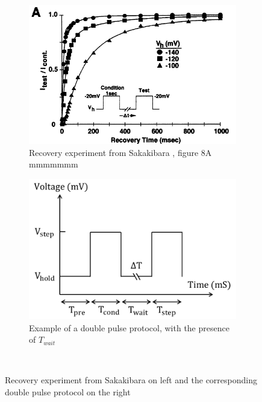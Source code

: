 \documentclass[11pt]{report}
\begin{document}
\begin{figure}[H]
    \centering
    \captionsetup{singlelinecheck = false, format= hang, justification=centerlast, font=footnotesize, labelsep=space}
    \begin{subfigure}[b]{0.49\textwidth}
    \centering
        \includegraphics[width=\linewidth]{figures/RecovSaka.png}
        \caption{Recovery experiment from Sakakibara \cite{Sakakibara1992}, figure 8A {\color{white} mmmmmmm }}
    \end{subfigure}
    \begin{subfigure}[b]{0.49\textwidth}
    \centering
        \includegraphics[width=\linewidth]{figures/DoublePulseProtocol.png}
        \caption{Example of a double pulse protocol, with the presence of $T_{wait}$ }
    \end{subfigure}

    ~
    \caption{Recovery experiment from Sakakibara \cite{Sakakibara1992} on left and the corresponding double pulse protocol on the right}
    \label{fig:RecovSaka}
\end{figure}
\end{document}
